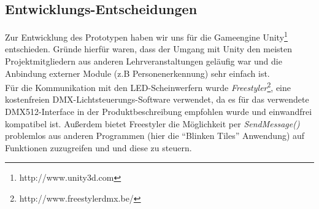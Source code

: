 \subsection{Entwicklungs-Entscheidungen}\label{ssec:entscheidungen}

Zur Entwicklung des Prototypen haben wir uns für die Gameengine Unity\footnote{http://www.unity3d.com} entschieden.
Gründe hierfür waren, dass der Umgang mit Unity den meisten Projektmitgliedern aus anderen Lehrveranstaltungen geläufig war und die Anbindung externer Module (z.B Personenerkennung) sehr einfach ist.\\
Für die Kommunikation mit den LED-Scheinwerfern wurde \emph{Freestyler}\footnote{http://www.freestylerdmx.be/}, eine kostenfreien DMX-Lichtsteuerungs-Software verwendet, da es für das verwendete DMX512-Interface in der Produktbeschreibung empfohlen wurde und einwandfrei kompatibel ist. Außerdem bietet Freestyler die Möglichkeit per \emph{SendMessage()} problemlos aus anderen Programmen (hier die "`Blinken Tiles"' Anwendung) auf Funktionen zuzugreifen und und diese zu steuern.